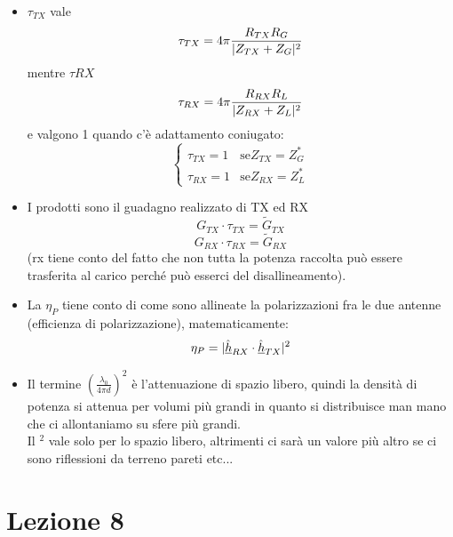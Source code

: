 \documentclass[oneside, 12pt]{extbook}
\DeclarePairedDelimiter{\abs}{\lvert}{\rvert}
\begin{document}
\begin{itemize}
	\item $\tau_{TX}$ vale 
	\begin{equation}
		\tau_{TX} = 4\pi \dfrac{R_{TX} R_G}{\abs{Z_{TX} + Z_G}^2}
	\end{equation}
	mentre $\tau{RX}$
	\begin{equation}
		\tau_{RX} = 4\pi \dfrac{R_{RX} R_L}{\abs{Z_{RX} + Z_L}^2}
	\end{equation}
	e valgono 1 quando c'è adattamento coniugato: 
	\[
	\begin{cases}
		\tau_{TX} = 1 & \text{se} Z_{TX} = Z_G^*\\
		\tau_{RX} = 1 & \text{se} Z_{RX} = Z_L^*
	\end{cases}
	\]
	
	\item I prodotti sono il guadagno realizzato di TX ed RX 
	\begin{equation}
		G_{TX} \cdot \tau_{TX} = \tilde{G}_{TX}
	\end{equation}
	\begin{equation}
		G_{RX} \cdot \tau_{RX} = \tilde{G}_{RX}
	\end{equation}
	(rx tiene conto del fatto che non tutta la potenza raccolta può essere trasferita al carico perché può esserci del disallineamento).
	
	\item La $\eta_P$ tiene conto di come sono allineate la polarizzazioni fra le due antenne (efficienza di polarizzazione), matematicamente: 
	\begin{equation}
		\eta_P = \abs{\underline{\hat{h}}_{RX} \cdot \underline{\hat{h}}_{TX}}^2
	\end{equation}
	
	\item Il termine $(\frac{\lambda_0}{4 \pi d})^2$ è l'attenuazione di spazio libero, quindi la densità di potenza si attenua per volumi più grandi in quanto si distribuisce man mano che ci allontaniamo su sfere più grandi.\\Il $^2$ vale solo per lo spazio libero, altrimenti ci sarà un valore più altro se ci sono riflessioni da terreno pareti etc...
\end{itemize}


\chapter{Lezione 8}
\end{document}
